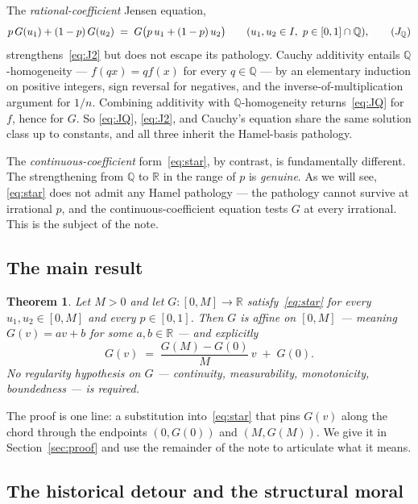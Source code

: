 \documentclass[review,12pt,a4paper]{elsarticle}
\newtheorem{theorem}{Theorem}[section]
\theoremstyle{remark}
\newcommand{\R}{\mathbb R}
\newcommand{\Q}{\mathbb Q}
\begin{document}
The \emph{rational-coefficient} Jensen equation,
\begin{equation}
p\,G(u_1)+(1-p)\,G(u_2) \;=\; G\bigl(p\,u_1+(1-p)\,u_2\bigr)
\qquad (u_1,u_2\in I,\ p\in[0,1]\cap\Q),
\tag{$J_{\Q}$}\label{eq:JQ}
\end{equation}
strengthens~\eqref{eq:J2} but does not escape its pathology. Cauchy
additivity entails $\Q$-homogeneity --- $f(qx)=qf(x)$ for every $q\in\Q$
--- by an elementary induction on positive integers, sign reversal for
negatives, and the inverse-of-multiplication argument for $1/n$. Combining
additivity with $\Q$-homogeneity returns~\eqref{eq:JQ} for $f$, hence for
$G$. So \eqref{eq:JQ}, \eqref{eq:J2}, and Cauchy's equation share the same
solution class up to constants, and all three inherit the Hamel-basis
pathology.

The \emph{continuous-coefficient} form~\eqref{eq:star}, by contrast, is
fundamentally different. The strengthening from $\Q$ to $\R$ in the range
of $p$ is \emph{genuine}. As we will see, \eqref{eq:star} does not admit
any Hamel pathology --- the pathology cannot survive at irrational $p$,
and the continuous-coefficient equation tests $G$ at every irrational.
This is the subject of the note.

\subsection{The main result}

\begin{theorem}\label{thm:main}
Let $M>0$ and let $G\colon[0,M]\to\R$ satisfy~\eqref{eq:star} for every
$u_1,u_2\in[0,M]$ and every $p\in[0,1]$. Then $G$ is affine on $[0,M]$ ---
meaning $G(v)=av+b$ for some $a,b\in\R$ --- and explicitly
\[
G(v) \;=\; \frac{G(M)-G(0)}{M}\,v \;+\; G(0).
\]
No regularity hypothesis on $G$ --- continuity, measurability, monotonicity,
boundedness --- is required.
\end{theorem}

The proof is one line: a substitution into~\eqref{eq:star} that pins
$G(v)$ along the chord through the endpoints $(0,G(0))$ and $(M,G(M))$. We
give it in Section~\ref{sec:proof} and use the remainder of the note to
articulate what it means.

\subsection{The historical detour and the structural moral}
\end{document}
